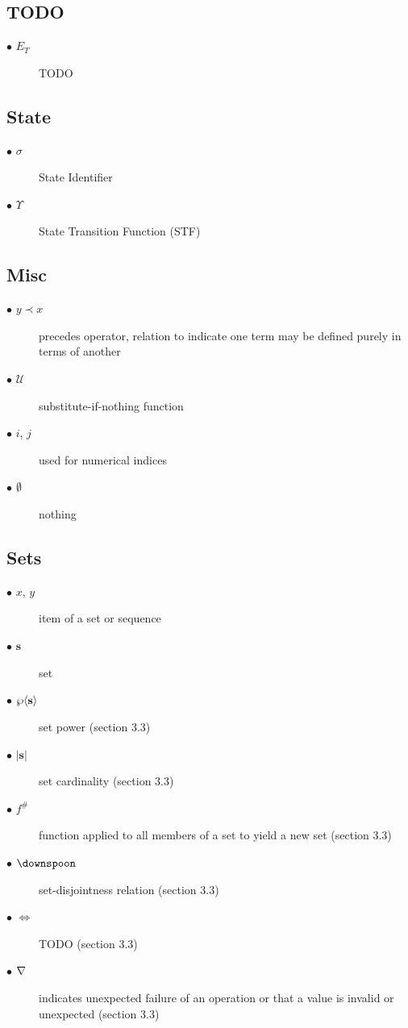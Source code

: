 \noindent

\subsection{TODO}\label{sec:todo}
\begin{description}
  \item[$\bullet$ ${E_T}$] TODO
\end{description}

\subsection{State}\label{sec:state}
\begin{description}
  \item[$\bullet$ $\sigma$] State Identifier
  \item[$\bullet$ $\Upsilon$] State Transition Function (STF)
\end{description}

\subsection{Misc}\label{sec:misc}
\begin{description}
  \item[$\bullet$ $y \prec x$] precedes operator, relation to indicate one term may be defined purely in terms of another
  \item[$\bullet$ $\mathcal{U}$] substitute-if-nothing function
  \item[$\bullet$ $i$, $j$] used for numerical indices
  \item[$\bullet$ $\emptyset$] nothing
\end{description}

\subsection{Sets}\label{sec:sets}
\begin{description}
  \item[$\bullet$ $x$, $y$] item of a set or sequence
  \item[$\bullet$ $\mathbf{s}$] set
  \item[$\bullet$ $\powset{\mathbf{s}}$] set power (section 3.3)
  \item[$\bullet$ $|\mathbf{s}|$] set cardinality (section 3.3)
  \item[$\bullet$ $f^{\#}$] function applied to all members of a set to yield a new set (section 3.3) 
  \item[$\bullet$ $\disjoint$] set-disjointness relation (section 3.3)
  \item[$\bullet$ $\Longleftrightarrow$] TODO (section 3.3)
  \item[$\bullet$ $\nabla$] indicates unexpected failure of an operation or that a value is invalid or unexpected (section 3.3) 
\end{description}

